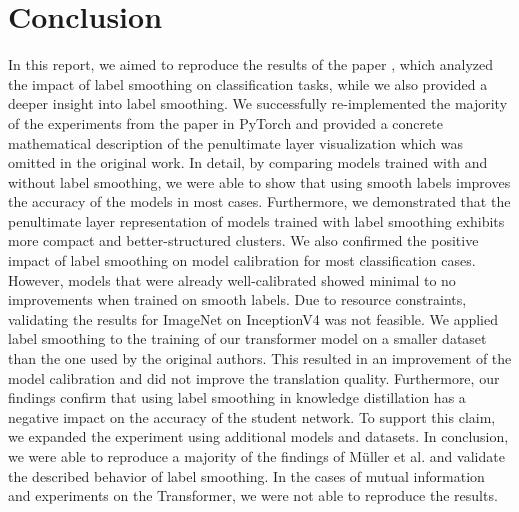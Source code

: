 \section{Conclusion}
In this report, we aimed to reproduce the results of the paper \cite{mueller2019}, which analyzed the impact of label smoothing on classification tasks, while we also provided a deeper insight into label smoothing.
We successfully re-implemented the majority of the experiments from the paper in PyTorch and provided a concrete mathematical description of the penultimate layer visualization which was omitted in the original work.
In detail, by comparing models trained with and without label smoothing, we were able to show that using smooth labels improves the accuracy of the models in most cases.
Furthermore, we demonstrated that the penultimate layer representation of models trained with label smoothing exhibits more compact and better-structured clusters.
We also confirmed the positive impact of label smoothing on model calibration for most classification cases. However, models that were already well-calibrated showed minimal to no improvements when trained on smooth labels. Due to resource constraints, validating the results for ImageNet on InceptionV4 was not feasible.
We applied label smoothing to the training of our transformer model on a smaller dataset than the one used by the original authors.
This resulted in an improvement of the model calibration and did not improve the translation quality.
Furthermore, our findings confirm that using label smoothing in knowledge distillation has a negative impact on the accuracy of the student network. To support this claim, we expanded the experiment using additional models and datasets.
In conclusion, we were able to reproduce a majority of the findings of Müller et al. \cite{mueller2019} and validate the described behavior of label smoothing. In the cases of mutual information and experiments on the Transformer, we were not able to reproduce the results. 
